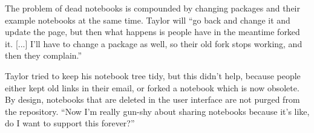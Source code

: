 The problem of dead notebooks is compounded by changing
packages and their example notebooks at the same time. Taylor will ``go back and
change it and update the page, but then what happens is people have in the
meantime forked it. [...]  I'll have to change a package as well, so their
old fork stops working, and then they complain.''

Taylor tried to keep his notebook tree tidy, but this didn't help, because
people either kept old links in their email, or forked a notebook which is now
obsolete. By design, notebooks that are deleted in the user interface are not
purged from the repository. ``Now I'm really gun-shy about sharing notebooks
because it's like, do I want to support this forever?''


